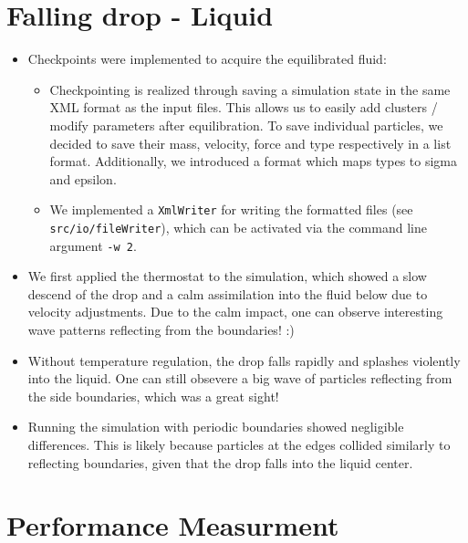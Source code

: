\documentclass{article}
\begin{document}
\section{Falling drop - Liquid}
\label{sec:drop}

    \begin{itemize}
        \item Checkpoints were implemented to acquire the equilibrated fluid:
        \begin{itemize}
            \item Checkpointing is realized through saving a simulation state in the same XML format as the input files. This allows us to easily add clusters / modify parameters after equilibration. To save individual particles, we decided to save their mass, velocity, force and type respectively in a list format. Additionally, we introduced a format which maps types to sigma and epsilon.
            \item We implemented a \texttt{XmlWriter} for writing the formatted files (see \texttt{src/io/fileWriter}), which can be activated via the command line argument \texttt{-w 2}.
        \end{itemize}
    \item We first applied the thermostat to the simulation, which showed a slow descend of the drop and a calm assimilation into the fluid below due to velocity adjustments. Due to the calm impact, one can observe interesting wave patterns reflecting from the boundaries! :)
        \item Without temperature regulation, the drop falls rapidly and splashes violently into the liquid. One can still obsevere a big wave of particles reflecting from the side boundaries, which was a great sight!
        \item Running the simulation with periodic boundaries showed negligible differences. This is likely because particles at the edges collided similarly to reflecting boundaries, given that the drop falls into the liquid center.    \end{itemize}


\section{Performance Measurment}
\label{sec:perf}
\end{document}

